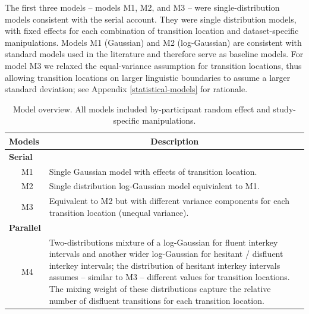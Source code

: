 \documentclass[
  man,floatsintext]{apa7}
\begin{document}
The first three models -- models M1, M2, and M3 -- were single-distribution models consistent with the serial account. They were single distribution models, with fixed effects for each combination of transition location and dataset-specific manipulations. Models M1 (Gaussian) and M2 (log-Gaussian) are consistent with standard models used in the literature and therefore serve as baseline models. For model M3 we relaxed the equal-variance assumption for transition locations, thus allowing transition locations on larger linguistic boundaries to assume a larger standard deviation; see Appendix \ref{statistical-models} for rationale.

\begin{table}[tbp]

\begin{center}
\begin{threeparttable}

\caption{\label{tab:models}Model overview. All models included by-participant random effect and study-specific manipulations.}

\begin{tabular}{lp{13cm}}
\toprule
Models & \multicolumn{1}{c}{Description}\\
\midrule
\textbf{Serial} & \\
\ \ \ M1 & Single Gaussian model with effects of transition location.\\
\ \ \ M2 & Single distribution log-Gaussian model equivialent to M1.\\
\ \ \ M3 & Equivalent to M2 but with different variance components for each transition location (unequal variance).\\
\textbf{Parallel} & \\
\ \ \ M4 & Two-distributions mixture of a log-Gaussian for fluent interkey intervals and another wider log-Gaussian for hesitant / disfluent interkey intervals; the distribution of hesitant interkey intervals assumes -- similar to M3 -- different values for transition locations. The mixing weight of these distributions capture the relative number of disfluent transitions for each transition location.\\
\bottomrule
\end{tabular}

\end{threeparttable}
\end{center}

\end{table}
\end{document}
